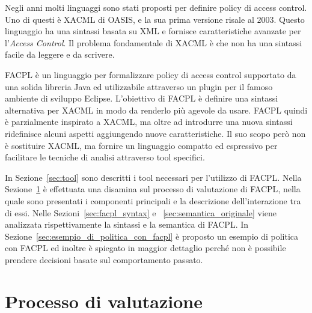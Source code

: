 \label{cap:facpl}
Negli anni molti linguaggi sono stati proposti per definire policy di access control. Uno di questi è \acf{XACML} di OASIS, e la sua prima versione risale al $2003$. Questo linguaggio ha una sintassi basata su \ac{XML} e fornisce caratteristiche avanzate per l'\textit{Access Control}. Il problema fondamentale di \ac{XACML} è che non ha una sintassi facile da leggere e da scrivere. \par
\acf{FACPL} è un linguaggio per formalizzare policy di access control supportato da una solida libreria Java ed utilizzabile attraverso un plugin per il famoso ambiente di sviluppo Eclipse.
L'obiettivo di \ac{FACPL} è definire una sintassi alternativa per \ac{XACML} in modo da renderlo più agevole da usare.
\ac{FACPL} quindi è parzialmente inspirato a \ac{XACML}, ma oltre ad introdurre una nuova sintassi ridefinisce alcuni aspetti aggiungendo nuove caratteristiche. Il suo scopo però non è sostituire \ac{XACML}, ma fornire un linguaggio compatto ed espressivo per facilitare le tecniche di analisi attraverso tool specifici.\par
In Sezione~\ref{sec:tool} sono descritti i tool necessari per l'utilizzo di 
\ac{FACPL}.
Nella Sezione~\ref{sec:valutazione_facpl} è effettuata una disamina sul processo di valutazione di \ac{FACPL}, nella quale sono presentati i componenti principali e la descrizione dell'interazione tra di essi.
Nelle Sezioni~\ref{sec:facpl_syntax} e ~\ref{sec:semantica_originale} viene analizzata rispettivamente la sintassi e la semantica di \ac{FACPL}.
In Sezione~\ref{sec:esempio_di_politica_con_facpl} è proposto un esempio di politica con \ac{FACPL} ed inoltre è spiegato in maggior dettaglio perché non è possibile prendere decisioni basate sul comportamento passato.





\section{Processo di valutazione}
\label{sec:valutazione_facpl}



